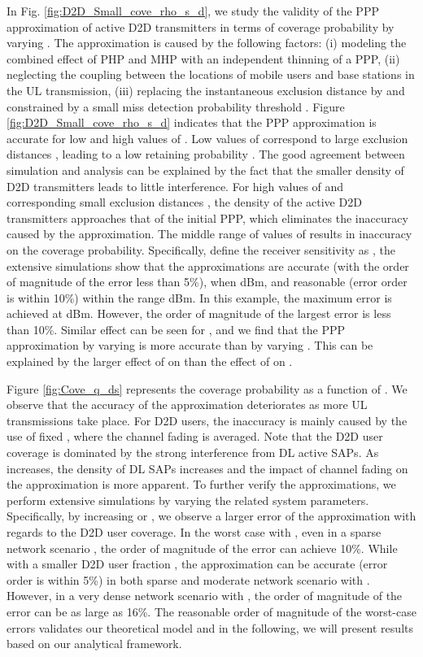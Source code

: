 \documentclass[twocolumn,english]{IEEEtran}
\theoremstyle{plain}
\theoremstyle{definition}
\begin{document}
In Fig. \ref{fig:D2D_Small_cove_rho_s_d}, we study the validity of
the PPP approximation of active D2D transmitters in terms of coverage
probability by varying . The approximation is
caused by the following factors: (i) modeling the combined effect
of PHP and MHP with an independent thinning of a PPP, (ii) neglecting
the coupling between the locations of mobile users and base stations
in the UL transmission, (iii) replacing the instantaneous exclusion
distance by  and  constrained
by a small miss detection probability threshold . Figure
\ref{fig:D2D_Small_cove_rho_s_d} indicates that the PPP approximation
is accurate for low and high values of . Low values
of  correspond to large exclusion distances ,
leading to a low retaining probability . The good agreement
between simulation and analysis can be explained by the fact that
the smaller density of D2D transmitters leads to little interference.
For high values of  and corresponding small exclusion
distances , the density of the active D2D transmitters
approaches that of the initial PPP, which eliminates the inaccuracy
caused by the approximation. The middle range of values of 
results in inaccuracy on the coverage probability. Specifically, define
the receiver sensitivity as , the extensive
simulations show that the approximations are accurate (with the order
of magnitude of the error less than 5\%), when 
dBm, and reasonable (error order is within 10\%) within the range
 dBm. In this example, the maximum error is achieved at
 dBm. However, the order of magnitude of the
largest error is less than 10\%. Similar effect can be seen for ,
and we find that the PPP approximation by varying 
is more accurate than by varying . This can be
explained by the larger effect of  on 
than the effect of  on .

Figure \ref{fig:Cove_q_ds} represents the coverage probability as
a function of . We observe that the accuracy of
the approximation deteriorates as more UL transmissions take place.
For D2D users, the inaccuracy is mainly caused by the use of fixed
, where the channel fading is averaged. Note
that the D2D user coverage is dominated by the strong interference
from DL active SAPs. As  increases, the density
of DL SAPs increases and the impact of channel fading on the approximation
is more apparent. To further verify the approximations, we perform
extensive simulations by varying the related system parameters. Specifically,
by increasing  or , we observe a larger
error of the approximation with regards to the D2D user coverage.
In the worst case with , even in a sparse network scenario
, the order of magnitude
of the error can achieve 10\%. While with a smaller D2D user fraction
, the approximation can be accurate (error order is within
5\%) in both sparse and moderate network scenario with .
However, in a very dense network scenario with ,
the order of magnitude of the error can be as large as 16\%. The reasonable
order of magnitude of the worst-case errors validates our theoretical
model and in the following, we will present results based on our analytical
framework.
\end{document}
